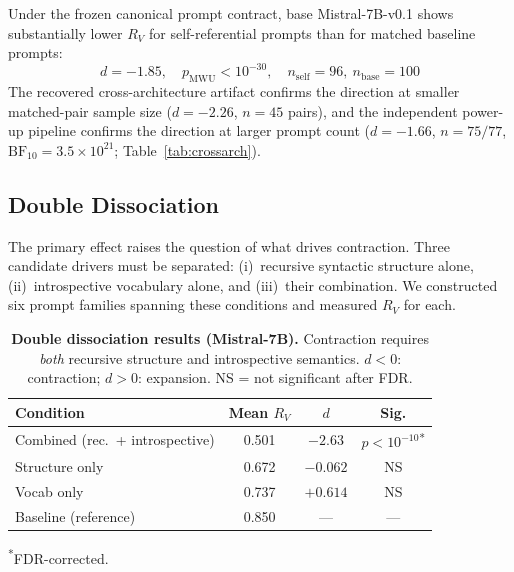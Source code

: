 \documentclass{article}
\newcommand{\RV}{R_V}
\newcommand{\dcohen}{d}
\begin{document}
Under the frozen canonical prompt contract, base Mistral-7B-v0.1 shows substantially lower $\RV$
for self-referential prompts than for matched baseline prompts:
\begin{equation}
\dcohen = -1.85, \quad p_{\mathrm{MWU}} < 10^{-30}, \quad n_\mathrm{self}=96,\ n_\mathrm{base}=100
\label{eq:primary}
\end{equation}
The recovered cross-architecture artifact confirms the direction at smaller matched-pair sample size
($\dcohen = -2.26$, $n = 45$ pairs), and the independent power-up pipeline confirms the direction
at larger prompt count
($\dcohen = -1.66$, $n = 75/77$, $\mathrm{BF}_{10} = 3.5 \times 10^{21}$;
Table~\ref{tab:crossarch}).

\subsection{Double Dissociation}
\label{sec:dissociation}


The primary effect raises the question of what drives contraction.
Three candidate drivers must be separated: (i)~recursive syntactic structure alone,
(ii)~introspective vocabulary alone, and (iii)~their combination.
We constructed six prompt families spanning these conditions and measured $\RV$ for each.

\begin{table}[ht]
\centering
\caption{\textbf{Double dissociation results (Mistral-7B).}
         Contraction requires \emph{both} recursive structure and introspective semantics.
         $\dcohen < 0$: contraction; $\dcohen > 0$: expansion. NS = not significant after FDR.}
\label{tab:dissociation}
\smallskip
\small
\begin{tabular}{lccc}
\toprule
\textbf{Condition} & \textbf{Mean $\RV$} & \textbf{$\dcohen$} & \textbf{Sig.} \\
\midrule
Combined (rec.\ + introspective) & 0.501 & $-2.63$ & $p < 10^{-10}$\textsuperscript{*} \\
Structure only             & 0.672 & $-0.062$ & NS \\
Vocab only                 & 0.737 & $+0.614$ & NS \\
\midrule
Baseline (reference)       & 0.850 & --- & --- \\
\bottomrule
\end{tabular}

\vspace{1mm}\raggedright\footnotesize\textsuperscript{*}FDR-corrected.
\end{table}
\end{document}
